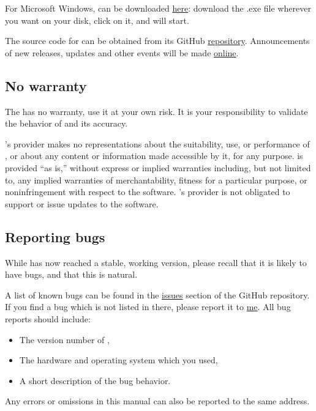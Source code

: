 \documentclass{ol-softwaremanual}
\begin{document}
For Microsoft Windows, \thel can be downloaded  \href{\thelemacusurl}{here}: download the .exe file wherever you want on your disk, click on it, and \thel will start. 

The source code for \thel can be obtained from its  GitHub \href{https://github.com/mcastel1/thelemacus}{repository}. Announcements of new releases, updates and other  events will be  made \href{\thelemacusurl}{online}. 

\subsection{No warranty}

The \thel has no warranty, use it at your own risk. It is your responsibility to validate the behavior of \thel and its accuracy. 

\thel's provider makes no representations about the
suitability, use, or performance of \thel, or about any
content or information made accessible by it, for any
purpose. \thel is provided ``as is,'' without express or
implied warranties including, but not limited to, any implied
warranties of merchantability, fitness for a particular purpose, or
noninfringement with respect to the software. \thel's provider is not
obligated to support or issue updates to the software.

\subsection{Reporting bugs}

While \thel has now reached a stable, working version, please recall that it is likely to have bugs, and that this is natural. 

A list of known bugs can be found in the \href{\issuesurl}{issues} section of the GitHub repository.
If you find a bug which is not listed in there, please report it to \href{mailto:michele.castellana@gmail.com}{me}. All bug reports should include:
\begin{itemize}
    \item The version number of \thel, 
    \item The hardware and operating system which you used, 
    \item A short description of the bug behavior. 

\end{itemize}

Any errors or omissions in this manual can also be reported to the same address.
\end{document}
